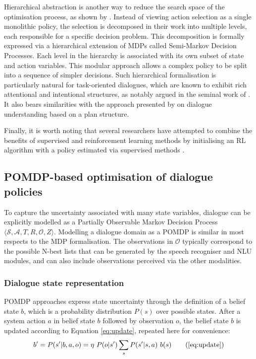 Hierarchical abstraction is another way to reduce the search space of the optimisation process, as shown by \cite{Heriberto2011}. Instead of viewing action selection as a single monolithic policy, the selection is decomposed in their work into multiple levels, each responsible for a specific decision problem.  This decomposition is formally expressed via a hierarchical extension of MDPs called Semi-Markov Decision Processes.  Each level in the hierarchy is associated with its own subset of state and action variables.  This modular approach allows a complex policy to be split into a sequence of simpler decisions.  Such hierarchical formalisation is particularly natural for task-oriented dialogues, which are known to exhibit rich attentional and intentional structures, as notably argued in the seminal work of \cite{Grosz:1986}. It also bears similarities with the approach presented by \cite{Litman87} on dialogue understanding based on a plan structure. 

Finally, it is worth noting that several researchers have attempted to combine the benefits of supervised and reinforcement learning methods by initialising an RL algorithm with a policy estimated via supervised methods \citep{williams2003, rieser2006}.

\subsection{POMDP-based optimisation of dialogue policies}

To capture the uncertainty associated with many state variables, dialogue can be explicitly modelled as a Partially Observable Markov Decision Process $\langle \mathcal{S}, \mathcal{A}, T, R, \mathcal{O}, Z \rangle$.  Modelling a dialogue domain as a POMDP is similar in most respects to the MDP formalisation.  The observations in $\mathcal{O}$ typically correspond to the possible N-best lists that can be generated by the speech recogniser and NLU modules, and can also include observations perceived via the other modalities.  

\subsubsection*{Dialogue state representation}

POMDP approaches express state uncertainty through the definition of a belief state $b$, which is a probability distribution $P(s)$ over possible states.  After a system action $a$ in belief state $b$ followed by observation $o$, the belief state $b$ is updated according to Equation \eqref{eq:update}, repeated here for convenience:
\begin{align}
b' = P(s'|b, a,o) = \eta \ P(o|s') \sum_{s} P(s'|s,a) \ b(s)   \tag{\ref{eq:update}}
\end{align}

